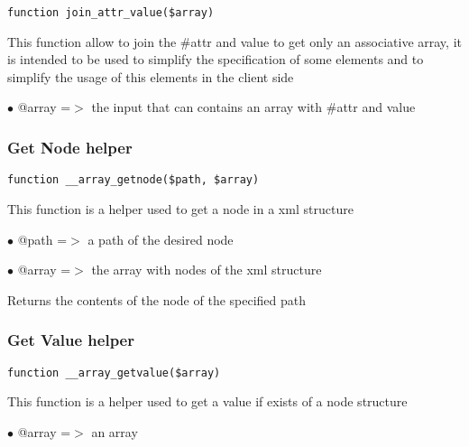 \documentclass[a4paper]{article}
\begin{document}
\begin{lstlisting}
function join_attr_value($array)
\end{lstlisting}

This function allow to join the \#attr and value to get only an associative
array, it is intended to be used to simplify the specification of some elements
and to simplify the usage of this elements in the client side

\begin{compactitem}
\item[\color{myblue}$\bullet$] @array =$>$ the input that can contains an array with \#attr and value
\end{compactitem}

\hypertarget{toc53}{}
\subsubsection{Get Node helper}

\begin{lstlisting}
function __array_getnode($path, $array)
\end{lstlisting}

This function is a helper used to get a node in a xml structure

\begin{compactitem}
\item[\color{myblue}$\bullet$] @path  =$>$ a path of the desired node
\item[\color{myblue}$\bullet$] @array =$>$ the array with nodes of the xml structure
\end{compactitem}

Returns the contents of the node of the specified path

\hypertarget{toc54}{}
\subsubsection{Get Value helper}

\begin{lstlisting}
function __array_getvalue($array)
\end{lstlisting}

This function is a helper used to get a value if exists of a node structure

\begin{compactitem}
\item[\color{myblue}$\bullet$] @array =$>$ an array
\end{compactitem}
\end{document}
